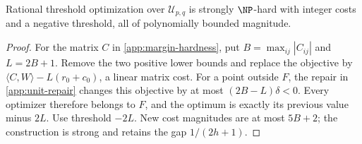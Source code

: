 \begin{corollary}
\label{app:unit-hardness}
Rational threshold optimization over $\mathcal U_{p,q}$ is strongly
$\NP$-hard with integer costs and a negative threshold, all of
polynomially bounded magnitude.
\end{corollary}
\begin{proof}
For the matrix $C$ in \cref{app:margin-hardness}, put
$B=\max_{ij}|C_{ij}|$ and $L=2B+1$. Remove the two positive lower
bounds and replace the objective by
$\langle C,W\rangle-L(r_0+c_0)$, a linear matrix cost.
For a point outside $F$, the repair in \cref{app:unit-repair} changes
this objective by at most $(2B-L)\delta<0$. Every optimizer therefore
belongs to $F$, and the optimum is exactly its previous value minus
$2L$. Use threshold $-2L$. New cost magnitudes are at most $5B+2$;
the construction is strong and retains the gap $1/(2h+1)$.
\end{proof}

